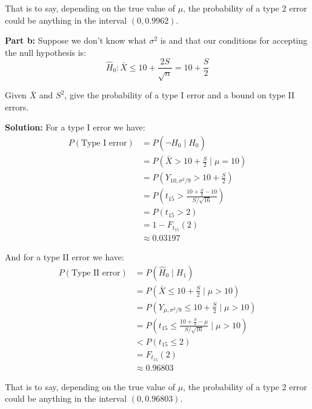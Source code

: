 \documentclass{article}
\begin{document}
That is to say, depending on the true value of $\mu$, the probability of a type 2 error could be anything in the interval $(0,0.9962)$.
\bigskip
\newpage

\noindent\textbf{Part b:} Suppose we don't know what $\sigma^2$ is and that our conditions for accepting the null hypothesis is:
$$\hat H_0:\bar X\le 10+\frac{2S}{\sqrt{n}}=10+\frac{S}{2}$$

Given $\bar X$ and $S^2$, give the probability of a type I error and a bound on type II errors.
\bigskip

\noindent\textbf{Solution:} For a type I error we have:
\begin{align*}
    P(\text{Type I error})&=P(\neg\hat H_0\mid H_0)\tag{def. of type I error}\\
    &=P\left(\bar X>10+\frac{S}{2}\mid\mu=10\right)\tag{from def. of hypotheses}\\
    &=P\left(Y_{10,\sigma^2/9}>10+\frac{S}{2}\right)\tag{$\bar X\sim\mathcal N(\mu,\sigma^2/n)$ mean of i.i.d. normals}\\
    &=P\left(t_{15}>\frac{10+\frac{S}{2}-10}{S/\sqrt{16}}\right)\tag{sample mean to $t$-distribution}\\
    &=P\left(t_{15}>2\right)\\
    &=1-F_{t_{15}}\left(2\right)\tag{cdf of $t$-distribution}\\
    &\approx0.03197
\end{align*}

And for a type II error we have:
\begin{align*}
    P(\text{Type II error})&=P(\hat H_0\mid H_1)\tag{def. of type II error}\\
    &=P\left(\bar X\le10+\frac{S}{2}\mid\mu>10\right)\tag{from def. of hypotheses}\\
    &=P\left(Y_{\mu,\sigma^2/9}\le10+\frac{S}{2}\mid\mu>10\right)\tag{$\bar X\sim\mathcal N(\mu,\sigma^2/n)$ mean of i.i.d. normals}\\
    &=P\left(t_{15}\le\frac{10+\frac{S}{2}-\mu}{S/\sqrt{16}}\mid\mu>10\right)\tag{sample mean to $t$-distribution}\\
    &<P\left(t_{15}\le2\right)\tag{cdf of $t$-distribution is strictly increasing}\\
    &=F_{t_{15}}\left(2\right)\\
    &\approx0.96803
\end{align*}

That is to say, depending on the true value of $\mu$, the probability of a type 2 error could be anything in the interval $(0,0.96803)$.
\end{document}

